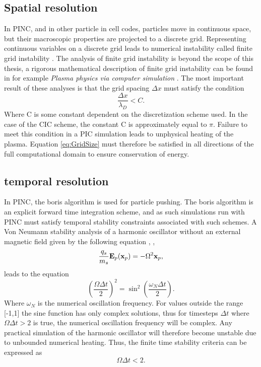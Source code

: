 \subsection{Spatial resolution}
In PINC, and in other particle in cell codes, particles move in continuous space, but their macroscopic properties are projected to a discrete grid. Representing continuous variables on a discrete grid leads to numerical instability called finite grid instability \parencite[section 5.1.]{Lapenta2011}. The analysis of finite grid instability is beyond the scope of this thesis, a rigorous mathematical description of finite grid instability can be found in for example \textit{Plasma physics via computer simulation} \parencite{Birdsall2004}. The most important result of these analyses is that the grid spacing $\Delta x$ must satisfy the condition
\begin{equation}\label{eq:GridSize}
    \frac{\Delta x}{\lambda_D} < C.
\end{equation}
Where C is some constant dependent on the discretization scheme used. In the case of the CIC scheme, the constant C is approximately equal to $\pi$. Failure to meet this condition in a PIC simulation leads to unphysical heating of the plasma. Equation \eqref{eq:GridSize} must therefore be satisfied in all directions of the full computational domain to ensure conservation of energy.

\subsection{temporal resolution}
In PINC, the boris algorithm is used for particle pushing. The boris algorithm is an explicit forward time integration scheme, and as such simulations run with PINC must satisfy temporal stability constraints associated with such schemes. A Von Neumann stability analysis of a harmonic oscillator without an external magnetic field given by the following equation \parencite{Hockney1988}, \parencite{Birdsall2004}, \parencite{Lapenta2011} 
\begin{equation}\label{eq:harmonicOscillator}
    \frac{q_s}{m_s} \vb{E}_p(\vb{x}_p) = - \Omega^2 \vb{x}_p,
\end{equation}
leads to the equation 
\begin{equation}
    \left(\frac{\Omega \Delta t}{2} \right)^2 = \sin^2{\left(\frac{\omega_N \Delta t}{2}\right)}.
\end{equation}
Where $\omega_N$ is the numerical oscillation frequency. For values outside the range [-1,1] the sine function has only complex solutions, thus for timesteps $\Delta t$ where  $\Omega \Delta t > 2$ is true, the numerical oscillation frequency will be complex. Any practical simulation of the harmonic oscillator will therefore become unstable due to unbounded numerical heating. Thus, the finite time stability criteria can be expressed as
\begin{equation}
    \Omega \Delta t < 2.
\end{equation}

